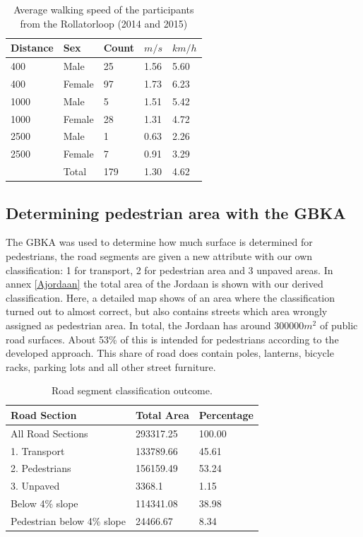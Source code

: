 \clearpage
\begin{table}[t]
\caption{Average walking speed of the participants from the Rollatorloop (2014 and 2015) \label{statistiswalkingspeed}}
\centering
\begin{tabular}{|p{70pt}|p{70pt}|p{70pt}|p{70pt}|p{70pt}|}
\hline
Distance & Sex & Count & $m/s$ & $km/h$ \\
\hline
400 & Male	 & 25	& 1.56 & 5.60 \\
400 & Female & 97	& 1.73 & 6.23 \\
\hline
1000 & Male		& 5	 & 1.51	 & 5.42\\
1000 & Female	& 28 & 	1.31 & 4.72\\
\hline
2500 & Male		& 1	 & 0.63	 & 2.26\\
2500 & Female	& 7	 & 0.91	 & 3.29\\
\hline
& Total & 179 & 1.30 & 4.62 \\
\hline
\end{tabular}
\end{table}


\subsection{Determining pedestrian area with the GBKA}
The GBKA was used to determine how much surface is determined for pedestrians, the road segments are given a new attribute with our own classification: 1 for transport, 2 for pedestrian area and 3 unpaved areas. In annex \ref{Ajordaan} the total area of the Jordaan is shown with our derived classification. Here, a detailed map shows of an area where the classification turned out to almost correct, but also contains streets which area wrongly assigned as pedestrian area. In total, the Jordaan has around 300000$m^2$ of public road surfaces. About 53\% of this is intended for pedestrians according to the developed approach. This share of road does contain poles, lanterns, bicycle racks, parking lots and all other street furniture. 

\begin{table}[h]
\caption{Road segment classification outcome. \label{statroadsections}}
\centering
\begin{tabular}{|l|l|l|}
\hline
Road Section & Total Area	& Percentage\\
\hline
All Road Sections & 293317.25 & 100.00\\
\hline
1. Transport & 133789.66 & 45.61\\
2. Pedestrians & 156159.49 & 53.24\\
3. Unpaved	& 3368.1 & 1.15\\
\hline
Below 4\% slope & 114341.08 & 38.98\\
Pedestrian below 4\% slope & 24466.67 & 8.34\\
\hline
\end{tabular}
\end{table}

